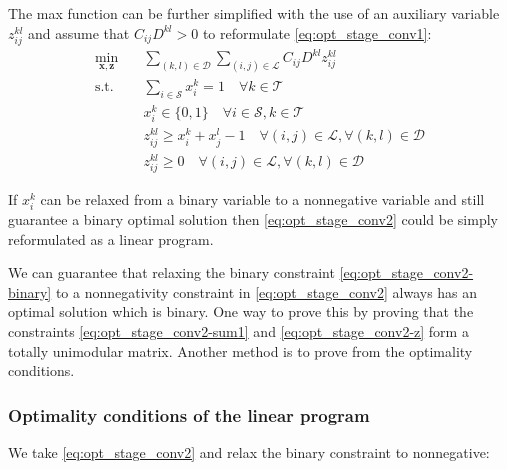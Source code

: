 The max function can be further simplified with the use of an auxiliary variable $z_{ij}^{kl}$ and assume that $C_{ij}D^{kl}>0$ to reformulate \eqref{eq:opt_stage_conv1}:
\begin{subequations}\label{eq:opt_stage_conv2}
	\begin{align}
		\min_{\mathbf{x},\mathbf{z}} \quad & \sum_{(k,l)\in\mathcal{D}}\sum_{(i,j)\in\mathcal{L}}C_{ij}D^{kl}z_{ij}^{kl} \nonumber \\
		\text{s.t.}\quad & \sum_{i\in\mathcal{S}}x_i^k = 1 \quad \forall k\in\mathcal{T} \label{eq:opt_stage_conv2-sum1} \\
		& x_i^k \in \{0,1\} \quad \forall i\in\mathcal{S},k\in\mathcal{T} \label{eq:opt_stage_conv2-binary} \\
		& z_{ij}^{kl} \geq x_i^k+x_j^l-1 \quad \forall (i,j)\in\mathcal{L}, \forall(k,l)\in\mathcal{D} \label{eq:opt_stage_conv2-z}\\
		& z_{ij}^{kl} \geq 0 \quad \forall (i,j)\in\mathcal{L}, \forall(k,l)\in\mathcal{D}
	\end{align}
\end{subequations}

If $x_{i}^k$ can be relaxed from a binary variable to a nonnegative variable and still guarantee a binary optimal solution then \eqref{eq:opt_stage_conv2} could be simply reformulated as a linear program.

\begin{conjecture}
	We can guarantee that relaxing the binary constraint \eqref{eq:opt_stage_conv2-binary} to a nonnegativity constraint in \eqref{eq:opt_stage_conv2} always has an optimal solution which is binary.
	One way to prove this by proving that the constraints \eqref{eq:opt_stage_conv2-sum1} and  \eqref{eq:opt_stage_conv2-z} form a totally unimodular matrix.
	Another method is to prove from the optimality conditions.
\end{conjecture}


\subsubsection{Optimality conditions of the linear program}
We take \eqref{eq:opt_stage_conv2} and relax the binary constraint to nonnegative:

